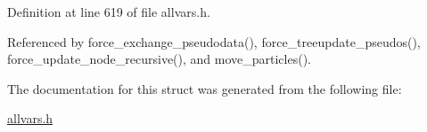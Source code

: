 Definition at line 619 of file allvars.h.



Referenced by force\_\-exchange\_\-pseudodata(), force\_\-treeupdate\_\-pseudos(), force\_\-update\_\-node\_\-recursive(), and move\_\-particles().



The documentation for this struct was generated from the following file:\begin{DoxyCompactItemize}
\item 
\hyperlink{allvars_8h}{allvars.h}\end{DoxyCompactItemize}
